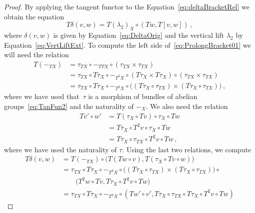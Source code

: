 \documentclass[12pt,reqno, a4paper]{amsart}
\numberwithin{equation}{section}
\theoremstyle{plain}
\theoremstyle{definition}
\theoremstyle{remark}
\begin{document}
\begin{proof}
By applying the tangent functor to the Equation~\eqref{eq:deltaBracketRel} we obtain the equation
\begin{equation}
\label{eq:ProlongBracket01}
  T\delta(v,w) = T(\lambda_2)_X \circ (Tw, T[v,w])
  \,,
\end{equation}
where $\delta(v,w)$ is given by Equation~\eqref{eq:DeltaOrig} and the vertical lift $\lambda_2$ by Equation~\eqref{eq:VertLiftExt}. To compute the left side of~\eqref{eq:ProlongBracket01} we will need the relation
\begin{equation*}
\begin{split}
  T(-_{TX})
  &= \tau_{TX} \circ -_{TTX} \circ (\tau_{TX} \times \tau_{TX})
  \\
  &= \tau_{TX} \circ T\tau_X \circ -_{T^2 X} \circ
  (T\tau_X \times T\tau_X) \circ
  (\tau_{TX} \times \tau_{TX})
  \\
  &= \tau_{TX} \circ T\tau_X \circ -_{T^2 X} \circ
    \bigl( (T\tau_X \circ \tau_{TX}) \times (T\tau_X \circ \tau_{TX}) \bigr)
  \,,
\end{split}
\end{equation*}
where we have used that~$\tau$ is a morphism of bundles of abelian groups~\eqref{eq:TanFun2} and the naturality of $-_X$. We also need the relation
\begin{equation*}
\begin{split}
  Tv' \circ w'
  &= T(\tau_X \circ Tv) \circ \tau_X \circ Tw
  \\
  &= T\tau_X \circ T^2 v \circ \tau_X \circ Tw
  \\
  &= T\tau_X \circ \tau_{TX} \circ T^2 v \circ Tw
  \,,
\end{split}
\end{equation*}
where we have used the naturality of $\tau$. Using the last two relations, we compute
\begin{equation}
\label{eq:ProlongBracket02}
\begin{split}
  T\delta(v,w)
  &= T(-_{TX}) \circ\bigl( T(Tw \circ v), T(\tau_X \circ Tv \circ w) \bigr)
  \\
  &= \tau_{TX} \circ T\tau_X \circ -_{T^2 X} \circ
    \bigl( (T\tau_X \circ \tau_{TX}) \times (T\tau_X \circ \tau_{TX}) \bigr) \circ
  \\
  &\qquad{}
  \bigl( T^2 w \circ Tv, T\tau_X \circ T^2 v \circ Tw \bigr)
  \\
  &= \tau_{TX} \circ T\tau_X \circ -_{T^2 X} \circ
     ( Tw' \circ v', T\tau_X \circ \tau_{TX} \circ T\tau_X \circ T^2 v \circ Tw )

\end{split}
\end{equation}
\end{proof}
\end{document}
